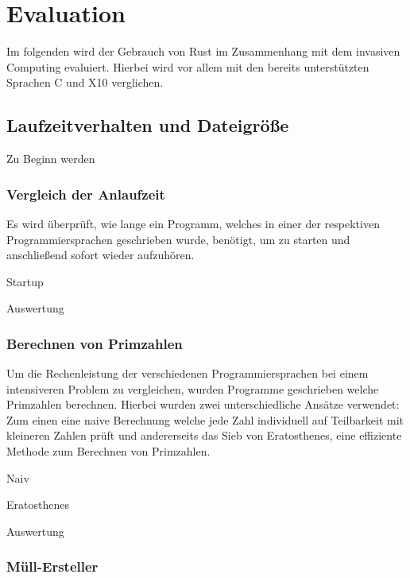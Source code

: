 \chapter{Evaluation}\label{sec:eval}

Im folgenden wird der Gebrauch von Rust im Zusammenhang mit dem invasiven Computing evaluiert. Hierbei
wird vor allem mit den bereits unterstützten Sprachen C und X10 verglichen.

\section{Laufzeitverhalten und Dateigröße}

Zu Beginn werden

\subsection{Vergleich der Anlaufzeit}

Es wird überprüft, wie lange ein Programm, welches in einer der respektiven Programmiersprachen geschrieben wurde,
benötigt, um zu starten und anschließend sofort wieder aufzuhören.

Startup %

Auswertung %

\subsection{Berechnen von Primzahlen}

Um die Rechenleistung der verschiedenen Programmiersprachen bei einem intensiveren Problem zu vergleichen, wurden
Programme geschrieben welche Primzahlen berechnen. Hierbei wurden zwei unterschiedliche Ansätze verwendet: Zum einen
eine naive Berechnung welche jede Zahl individuell auf Teilbarkeit mit kleineren Zahlen prüft und andererseits
das Sieb von Eratosthenes, eine effiziente Methode zum Berechnen von Primzahlen.

Naiv %

Eratosthenes %

Auswertung %


\subsection{Müll-Ersteller}

